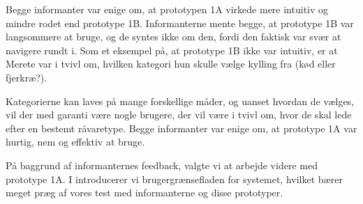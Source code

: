 Begge informanter var enige om, at prototypen 1A virkede mere intuitiv og mindre rodet end prototype 1B. Informanterne mente begge, at prototype 1B var langsommere at bruge, og de syntes ikke om den, fordi den faktisk var svær at navigere rundt i. Som et eksempel på, at prototype 1B ikke var intuitiv, er at Merete var i tvivl om, hvilken kategori hun skulle vælge kylling fra (kød eller fjerkræ?). 

Kategorierne kan laves på mange forskellige måder, og uanset hvordan de vælges, vil der med garanti være nogle brugere, der vil være i tvivl om, hvor de skal lede efter en bestemt råvaretype. Begge informanter var enige om, at prototype 1A var hurtig, nem og effektiv at bruge.

På baggrund af informanternes feedback, valgte vi at arbejde videre med prototype 1A. I  introducerer vi brugergrænsefladen for systemet, hvilket bærer meget præg af vores test med informanterne og disse prototyper.
